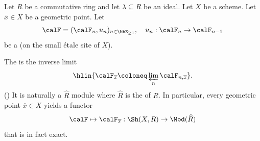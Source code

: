 \begin{definition} \label{definition:geometric_stalk_of_an_etale_lambda_adic_sheaf_on_a_scheme}
Let $R$ be a commutative ring and let $\lambda\subseteq R$ be an ideal. Let $X$ be a scheme. Let $\overline{x} \in X$ be a geometric point.  
    Let 
    $$\calF = (\calF_n, u_n)_{n \in \bbZ_{\geq 1}}, \quad u_n: \calF_n \to \calF_{n-1}$$
    be a  (on the small \'etale site of $X$). 

    The  is the inverse limit 
    $$\hlin{\calF_{\overline{x}} \coloneq \varprojlim_{n} \calF_{n, \overline{x}}}.$$
    ()
    It is naturally a $\widehat{R}$ module where $\widehat{R}$ is the  of $R$. In particular, every geometric point $\overline{x} \in X$ yields a functor
    $$\calF \mapsto \calF_{\overline{x}}: \Sh(X,R) \to \Mod(\widehat{R})$$
     that is in fact exact. 

    
\end{definition}